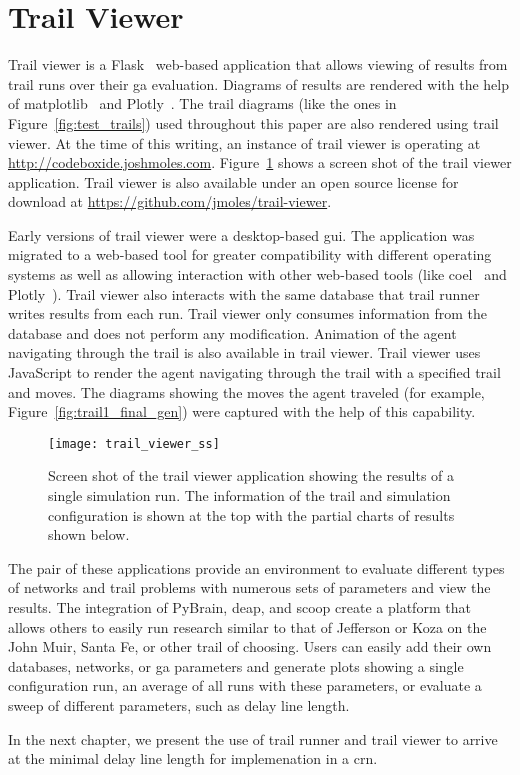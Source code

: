 \section{Trail Viewer}
Trail viewer is a Flask~\cite{Ronacher2010-mn} web-based application that allows viewing of results from trail runs over their \gls{ga} evaluation. Diagrams of results are rendered with the help of matplotlib~\cite{Hunter2007-yc} and Plotly~\cite{Plotly2012-po}. The trail diagrams (like the ones in Figure~\ref{fig:test_trails}) used throughout this paper are also rendered using trail viewer. At the time of this writing, an instance of trail viewer is operating at \url{http://codeboxide.joshmoles.com}. Figure~\ref{fig:trail_viewer_ss} shows a screen shot of the trail viewer application. Trail viewer is also available under an open source license for download at \url{https://github.com/jmoles/trail-viewer}.

Early versions of trail viewer were a desktop-based \gls{gui}. The application was migrated to a web-based tool for greater compatibility with different operating systems as well as allowing interaction with other web-based tools (like \gls{coel}~\cite{Banda2014-qw} and Plotly~\cite{Plotly2012-po}). Trail viewer also interacts with the same database that trail runner writes results from each run. Trail viewer only consumes information from the database and does not perform any modification. Animation of the agent navigating through the trail is also available in trail viewer. Trail viewer uses JavaScript to render the agent navigating through the trail with a specified trail and moves. The diagrams showing the moves the agent traveled (for example, Figure~\ref{fig:trail1_final_gen}) were captured with the help of this capability.

\begin{figure}
\centering
\texttt{[image: trail\_viewer\_ss]}
\caption[Screen Shot of Trail Viewer]{Screen shot of the trail viewer application showing the results of a single simulation run. The information of the trail and simulation configuration is shown at the top with the partial charts of results shown below.}
\label{fig:trail_viewer_ss}
\end{figure}

The pair of these applications provide an environment to evaluate different types of networks and trail problems with numerous sets of parameters and view the results. The integration of PyBrain, \gls{deap}, and \gls{scoop} create a platform that allows others to easily run research similar to that of Jefferson or Koza on the John Muir, Santa Fe, or other trail of choosing. Users can easily add their own databases, networks, or \gls{ga} parameters and generate plots showing a single configuration run, an average of all runs with these parameters, or evaluate a sweep of different parameters, such as delay line length.

In the next chapter, we present the use of trail runner and trail viewer to arrive at the minimal delay line length for implemenation in a \gls{crn}.